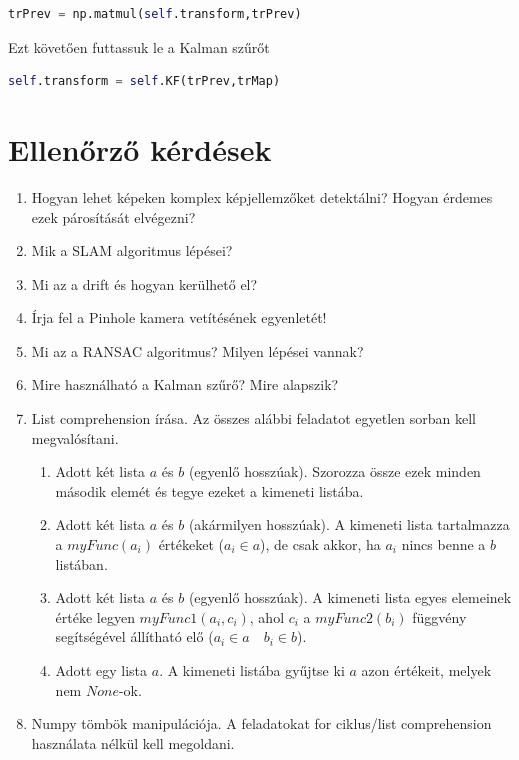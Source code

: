\documentclass[12pt,a4paper,oneside]{report}             %
\begin{document}
\begin{lstlisting}[language=Python]
trPrev = np.matmul(self.transform,trPrev)
\end{lstlisting}

Ezt követően futtassuk le a Kalman szűrőt

\begin{lstlisting}[language=Python]
self.transform = self.KF(trPrev,trMap)
\end{lstlisting}

\chapter{Ellenőrző kérdések}

\begin{enumerate}
	\item Hogyan lehet képeken komplex képjellemzőket detektálni? Hogyan érdemes ezek párosítását elvégezni?
	\item Mik a SLAM algoritmus lépései?
	\item Mi az a drift és hogyan kerülhető el?
	\item Írja fel a Pinhole kamera vetítésének egyenletét!
	\item Mi az a RANSAC algoritmus? Milyen lépései vannak?
	\item Mire használható a Kalman szűrő? Mire alapszik?
	\item List comprehension írása. Az összes alábbi feladatot egyetlen sorban kell megvalósítani.
	\begin{enumerate}
		\item Adott két lista $a$ és $b$ (egyenlő hosszúak). Szorozza össze ezek minden második elemét és tegye ezeket a kimeneti listába.
		\item Adott két lista $a$ és $b$ (akármilyen hosszúak). A kimeneti lista tartalmazza a $myFunc(a_i)$ értékeket ($a_i\in a$), de csak akkor, ha $a_i$ nincs benne a $b$ listában.
		\item Adott két lista $a$ és $b$ (egyenlő hosszúak). A kimeneti lista egyes elemeinek értéke legyen $myFunc1(a_i,c_i)$, ahol $c_i$ a $myFunc2(b_i)$ függvény segítségével állítható elő ($a_i\in a$~~$b_i\in b$).
		\item Adott egy lista $a$. A kimeneti listába gyűjtse ki $a$ azon értékeit, melyek nem $None$-ok.
	\end{enumerate}
	\item Numpy tömbök manipulációja. A feladatokat for ciklus/list comprehension használata nélkül kell megoldani.
	\begin{enumerate}

\end{enumerate}
\end{enumerate}
\end{document}
